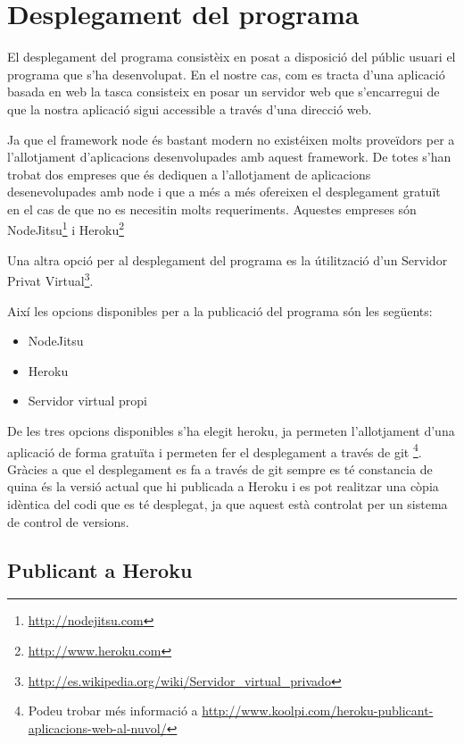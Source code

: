 \chapter{Desplegament del programa}
\label{chap:desplegament}

El desplegament del programa consistèix en posat a disposició del públic usuari el programa que s'ha desenvolupat. En el nostre cas, com es tracta d'una aplicació basada en web la tasca consisteix en posar un servidor web que s'encarregui de que la nostra aplicació sigui accessible a través d'una direcció web. 

Ja que el framework node és bastant modern no existéixen molts proveïdors per a l'allotjament d'aplicacions desenvolupades amb aquest framework. De totes s'han trobat dos empreses que és dediquen a l'allotjament de aplicacions desenevolupades amb node i que a més a més ofereixen el desplegament gratuït en el cas de que no es necesitin molts requeriments. Aquestes empreses són NodeJitsu\footnote{\url{http://nodejitsu.com}} i Heroku\footnote{\url{http://www.heroku.com}}

Una altra opció per al desplegament del programa es la útilització d'un Servidor Privat Virtual\footnote{\url{http://es.wikipedia.org/wiki/Servidor_virtual_privado}}. 

Així les opcions disponibles per a la publicació del programa són les següents: 

\begin{itemize}
\item{NodeJitsu}
\item{Heroku}
\item{Servidor virtual propi}
\end{itemize}


De les tres opcions disponibles s'ha elegit heroku, ja permeten l'allotjament d'una aplicació de forma gratuïta i permeten fer el desplegament a través de git \footnote{Podeu trobar més informació a \url{http://www.koolpi.com/heroku-publicant-aplicacions-web-al-nuvol/} }. Gràcies a que el desplegament es fa a través de git sempre es té constancia de quina és la versió actual que hi publicada a Heroku i es pot realitzar una còpia idèntica del codi que es té desplegat, ja que aquest està controlat per un sistema de control de versions.

\section{Publicant a Heroku}

